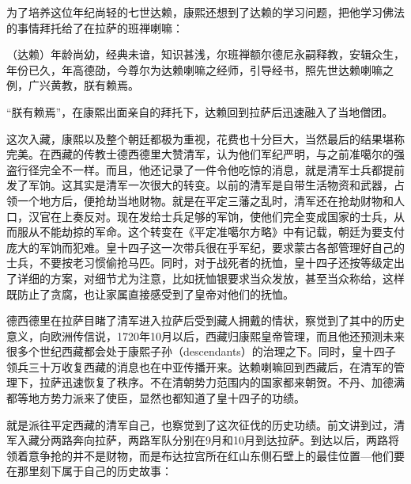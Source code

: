 
为了培养这位年纪尚轻的七世达赖，康熙还想到了达赖的学习问题，把他学习佛法的事情拜托给了在拉萨的班禅喇嘛：



\begin{bookquote}（达赖）年龄尚幼，经典未谙，知识甚浅，尔班禅额尔德尼永嗣释教，安辑众生，年份已久，年高德劭，今尊尔为达赖喇嘛之经师，引导经书，照先世达赖喇嘛之例，广兴黄教，朕有赖焉。\end{bookquote}


“朕有赖焉”，在康熙出面亲自的拜托下，达赖回到拉萨后迅速融入了当地僧团。



这次入藏，康熙以及整个朝廷都极为重视，花费也十分巨大，当然最后的结果堪称完美。在西藏的传教士德西德里大赞清军，认为他们军纪严明，与之前准噶尔的强盗行径完全不一样。而且，他还记录了一件令他吃惊的消息，就是清军士兵都提前发了军饷。这其实是清军一次很大的转变。以前的清军是自带生活物资和武器，占领一个地方后，便抢劫当地财物。就是在平定三藩之乱时，清军还在抢劫财物和人口，汉官在上奏反对。现在发给士兵足够的军饷，使他们完全变成国家的士兵，从而服从不能劫掠的军命。这个转变在《平定准噶尔方略》中有记载，朝廷为要支付庞大的军饷而犯难。皇十四子这一次带兵很在乎军纪，要求蒙古各部管理好自己的士兵，不要按老习惯偷抢马匹。同时，对于战死者的抚恤，皇十四子还按等级定出了详细的方案，对细节尤为注意，比如抚恤银要求当众发放，甚至当众称给，这样既防止了贪腐，也让家属直接感受到了皇帝对他们的抚恤。



德西德里在拉萨目睹了清军进入拉萨后受到藏人拥戴的情状，察觉到了其中的历史意义，向欧洲传信说，1720年10月以后，西藏归康熙皇帝管理，而且他还预测未来很多个世纪西藏都会处于康熙子孙（descendants）的治理之下。同时，皇十四子领兵三十万收复西藏的消息也在中亚传播开来。达赖喇嘛回到西藏后，在清军的管理下，拉萨迅速恢复了秩序。不在清朝势力范围内的国家都来朝贺。不丹、加德满都等地方势力派来了使臣，显然也都知道了皇十四子的功绩。



就是派往平定西藏的清军自己，也察觉到了这次征伐的历史功绩。前文讲到过，清军入藏分两路奔向拉萨，两路军队分别在9月和10月到达拉萨。到达以后，两路将领着意争抢的并不是财物，而是布达拉宫所在红山东侧石壁上的最佳位置—他们要在那里刻下属于自己的历史故事：


